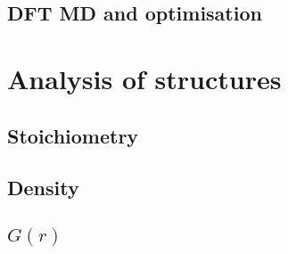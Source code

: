 \subsection{DFT MD and optimisation}
\section{Analysis of structures}
\subsection{Stoichiometry}
\subsection{Density}
\subsection{\texorpdfstring{$G(r)$}{G(r)}}
